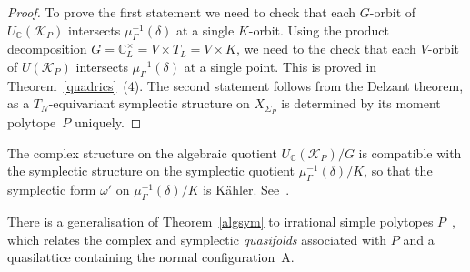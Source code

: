 \documentclass[a4paper]{amsart}
\theoremstyle{definition}
\theoremstyle{remark}
\numberwithin{equation}{section}
\def\C{\mathbb C}
\newcommand{\<}{\langle}
\renewcommand{\>}{\rangle}
\begin{document}
\begin{proof}
To prove the first statement we need to check that each $G$-orbit of $U_\C(\mathcal K_P)$ intersects $\mu_\Gamma^{-1}(\delta)$ at a single $K$-orbit. Using the product decomposition $G=\C^\times_L=V\times T_L=V\times K$, we need to the check that each $V$-orbit of $U(\mathcal K_P)$ intersects $\mu_\Gamma^{-1}(\delta)$ at a single point. This is proved in Theorem~\ref{quadrics}~(4). The second statement follows from the Delzant theorem, as a $T_N$-equivariant symplectic structure on $X_{\Sigma_P}$ is determined by its moment polytope~$P$ uniquely.
\end{proof}

The complex structure on the algebraic quotient $U_\C(\mathcal K_P)/G$ is compatible with the symplectic structure on the symplectic quotient 
$\mu_\Gamma^{-1}(\delta)/K$, so that the symplectic form $\omega'$ on 
$\mu_\Gamma^{-1}(\delta)/K$ is K\"ahler. See~\cite[Appendix~1, Theorem~1.5]{guil94}.

There is a generalisation of Theorem~\ref{algsym} to irrational simple polytopes $P$~\cite[Theorem~3.2]{ba-pr01}, which relates the complex and symplectic \emph{quasifolds} associated with $P$ and a quasilattice containing the normal configuration~$\mathrm A$.
\end{document}

